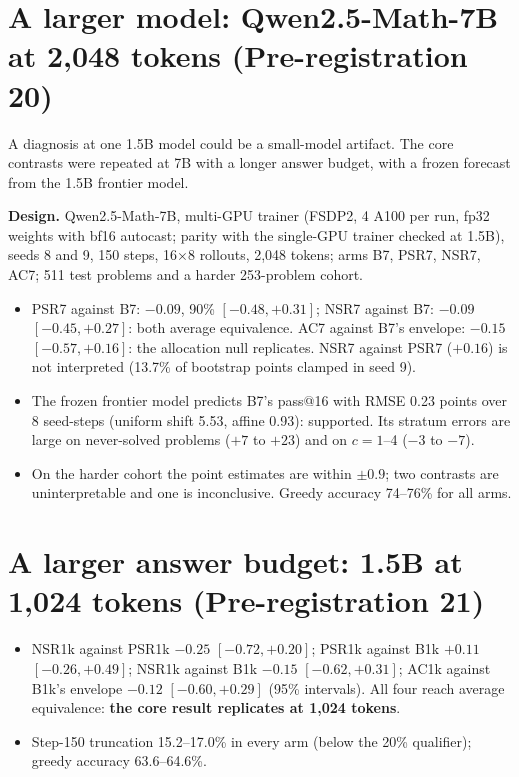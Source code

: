 \documentclass[11pt]{article}
\begin{document}
\section{A larger model: Qwen2.5-Math-7B at 2,048 tokens (Pre-registration 20)}
\begin{why}
A diagnosis at one 1.5B model could be a small-model artifact. The core contrasts were repeated at 7B with a longer answer budget, with a frozen forecast from the 1.5B frontier model.
\end{why}
\textbf{Design.} Qwen2.5-Math-7B, multi-GPU trainer (FSDP2, 4 A100 per run, fp32 weights with bf16 autocast; parity with the single-GPU trainer checked at 1.5B), seeds 8 and 9, 150 steps, 16$\times$8 rollouts, 2,048 tokens; arms B7, PSR7, NSR7, AC7; 511 test problems and a harder 253-problem cohort.
\begin{found}
\begin{itemize}[leftmargin=*,itemsep=1pt]
\item PSR7 against B7: $-0.09$, 90\% $[-0.48,+0.31]$; NSR7 against B7: $-0.09$ $[-0.45,+0.27]$: both average equivalence. AC7 against B7's envelope: $-0.15$ $[-0.57,+0.16]$: the allocation null replicates. NSR7 against PSR7 ($+0.16$) is not interpreted (13.7\% of bootstrap points clamped in seed 9).
\item The frozen frontier model predicts B7's pass@16 with RMSE 0.23 points over 8 seed-steps (uniform shift 5.53, affine 0.93): supported. Its stratum errors are large on never-solved problems ($+7$ to $+23$) and on $c=1$--4 ($-3$ to $-7$).
\item On the harder cohort the point estimates are within $\pm0.9$; two contrasts are uninterpretable and one is inconclusive. Greedy accuracy 74--76\% for all arms.
\end{itemize}
\end{found}

\section{A larger answer budget: 1.5B at 1,024 tokens (Pre-registration 21)}
\begin{found}
\begin{itemize}[leftmargin=*,itemsep=1pt]
\item NSR1k against PSR1k $-0.25$ $[-0.72,+0.20]$; PSR1k against B1k $+0.11$ $[-0.26,+0.49]$; NSR1k against B1k $-0.15$ $[-0.62,+0.31]$; AC1k against B1k's envelope $-0.12$ $[-0.60,+0.29]$ (95\% intervals). All four reach average equivalence: \textbf{the core result replicates at 1,024 tokens}.
\item Step-150 truncation 15.2--17.0\% in every arm (below the 20\% qualifier); greedy accuracy 63.6--64.6\%.
\end{itemize}
\end{found}
\end{document}
